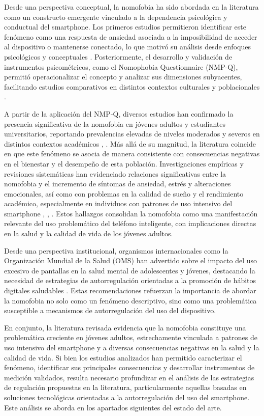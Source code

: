Desde una perspectiva conceptual, la nomofobia ha sido abordada en la literatura como un constructo emergente vinculado a la dependencia psicológica y conductual del smartphone. Los primeros estudios permitieron identificar este fenómeno como una respuesta de ansiedad asociada a la imposibilidad de acceder al dispositivo o mantenerse conectado, lo que motivó su análisis desde enfoques psicológicos y conceptuales \cite{YildirimCorreia2015}. Posteriormente, el desarrollo y validación de instrumentos psicométricos, como el Nomophobia Questionnaire (NMP-Q), permitió operacionalizar el concepto y analizar sus dimensiones subyacentes, facilitando estudios comparativos en distintos contextos culturales y poblacionales \cite{ijerph17020580}.

A partir de la aplicación del NMP-Q, diversos estudios han confirmado la presencia significativa de la nomofobia en jóvenes adultos y estudiantes universitarios, reportando prevalencias elevadas de niveles moderados y severos en distintos contextos académicos \cite{Ali31122024}, \cite{Aslani2025}. Más allá de su magnitud, la literatura coincide en que este fenómeno se asocia de manera consistente con consecuencias negativas en el bienestar y el desempeño de esta población. Investigaciones empíricas y revisiones sistemáticas han evidenciado relaciones significativas entre la nomofobia y el incremento de síntomas de ansiedad, estrés y alteraciones emocionales, así como con problemas en la calidad de sueño y el rendimiento académico, especialmente en individuos con patrones de uso intensivo del smartphone \cite{EXELMANS201693}, \cite{healthcare11142066}, \cite{Cha2023}. Estos hallazgos consolidan la nomofobia como una manifestación relevante del uso problemático del teléfono inteligente, con implicaciones directas en la salud y la calidad de vida de los jóvenes adultos.

Desde una perspectiva institucional, organismos internacionales como la Organización Mundial de la Salud (OMS) han advertido sobre el impacto del uso excesivo de pantallas en la salud mental de adolescentes y jóvenes, destacando la necesidad de estrategias de autorregulación orientadas a la promoción de hábitos digitales saludables \cite{WHO2024TeensScreens}. Estas recomendaciones refuerzan la importancia de abordar la nomofobia no solo como un fenómeno descriptivo, sino como una problemática susceptible a mecanismos de autorregulación del uso del dispositivo.

En conjunto, la literatura revisada evidencia que la nomofobia constituye una problemática creciente en jóvenes adultos, estrechamente vinculada a patrones de uso intensivo del smartphone y a diversas consecuencias negativas en la salud y la calidad de vida. Si bien los estudios analizados han permitido caracterizar el fenómeno, identificar sus principales consecuencias y desarrollar instrumentos de medición validados, resulta necesario profundizar en el análisis de las estrategias de regulación propuestas en la literatura, particularmente aquellas basadas en soluciones tecnológicas orientadas a la autorregulación del uso del smartphone. Este análisis se aborda en los apartados siguientes del estado del arte.

